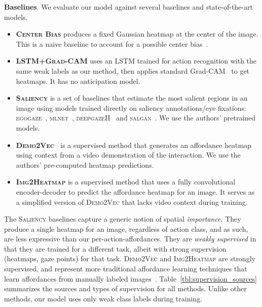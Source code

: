 \documentclass[10pt,twocolumn,letterpaper]{article}
\newcommand{\SC}[1]{{\textsc{#1}}}
\newcommand{\reftbl}[1]{Table~\ref{#1}}
\begin{document}
\vspace{0.05in}
\noindent\textbf{Baselines}. We evaluate our model against several baselines and state-of-the-art models. 
\begin{itemize}[leftmargin=*]
\itemsep0em 
\item \textbf{\SC{Center Bias}} produces a fixed Gaussian heatmap at the center of the image. This is a naive baseline to account for a possible center bias~\cite{mlnet2016,deepgaze2016,pan2017salgan,huang2018predicting}.
\item \textbf{\SC{LSTM+Grad-CAM}} uses an LSTM trained for action recognition with the same weak labels as our method, then applies standard Grad-CAM~\cite{selvaraju2017grad} to get heatmaps.  It has no anticipation model.
\item \textbf{\SC{Saliency}} is a set of baselines that estimate the most salient regions in an image using models trained directly on saliency annotations/eye fixations: \SC{egogaze}~\cite{huang2018predicting}, \SC{mlnet}~\cite{mlnet2016}, \SC{deepgazeII}~\cite{deepgaze2016} and \SC{salgan}~\cite{pan2017salgan}. We use the authors' pretrained models.
\item \textbf{\SC{Demo2Vec}}~\cite{fang2018demo2vec} is a supervised method that
 generates an affordance heatmap using context from a video demonstration of the interaction. We use the authors' pre-computed heatmap predictions.\item \textbf{\SC{Img2Heatmap}} is a supervised method that uses a fully convolutional encoder-decoder to predict the affordance heatmap for an image.  It serves as a simplified version of \SC{Demo2Vec} that lacks video context during training.
\end{itemize}


The \SC{Saliency} baselines capture a generic notion of spatial \emph{importance}.  They produce a single heatmap for an image, regardless of action class, and as such, are less expressive than our per-action-affordances. They are \emph{weakly supervised} in that they are trained for a different task, albeit with strong supervision (heatmaps, gaze points) for that task. 
\SC{Demo2Vec} and \SC{Img2Heatmap} are strongly supervised, and represent more traditional affordance learning techniques that learn affordances from manually labeled images~\cite{myers2015affordance,roy2016multi,nguyen2017object,do2017affordancenet}.
\reftbl{tbl:supervision_sources} summarizes the sources and types of supervision for all methods. Unlike other methods, our model uses only weak class labels during training.
\end{document}
